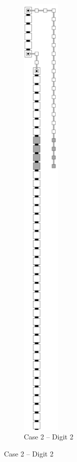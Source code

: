 \begin{itemize}
\begin{figure}[H]
\begin{subfigure}[t]{0.2\textwidth}
                    \includegraphics[width=0.2\textwidth]{warping/digit_top_case2_digit2_msr}
                    \caption{\label{fig:warping/digit_top_case2_digit2_msr} Case 2 -- Digit 2}
                \end{subfigure}%
            \end{figure}


\end{itemize}
